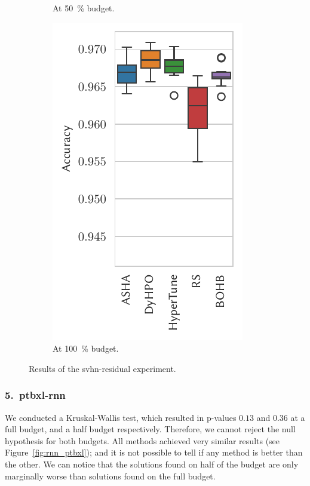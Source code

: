 \begin{figure}[H]
\begin{subfigure}{.26\textwidth}
        \caption{At \SI{50}{\percent} budget.}%
    \end{subfigure}%
    \begin{subfigure}{.26\textwidth}
        \includegraphics[height=\plotheight]{img/real_exp/svhn_residual_boxplot_full.pdf}%
        \caption{At \SI{100}{\percent} budget.}%
    \end{subfigure}%
\caption{Results of the svhn-residual experiment.}
\label{fig:resnet_svhn}
\end{figure}


\subsubsection{5.\ ptbxl-rnn}
We conducted a Kruskal-Wallis test, which resulted in p-values $0.13$ and $0.36$ at a full budget, and a half budget respectively. Therefore, we cannot reject the null hypothesis for both budgets. All methods achieved very similar results (see Figure~\ref{fig:rnn_ptbxl}); and it is not possible to tell if any method is better than the other. We can notice that the solutions found on half of the budget are only marginally worse than solutions found on the full budget.

